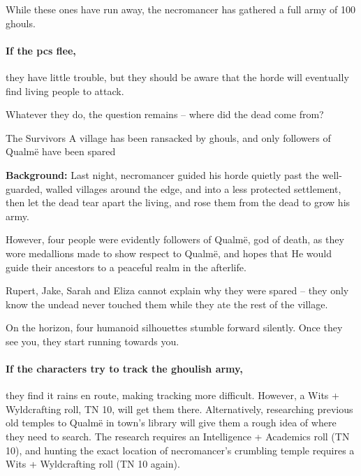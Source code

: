 While these ones have run away, the necromancer has gathered a full army of 100 ghouls.

\paragraph{If the \glspl{pc} flee,}
they have little trouble, but they should be aware that the horde will eventually find living people to attack.

Whatever they do, the question remains -- where did the dead come from?

{The Survivors}%
{A village has been ransacked by ghouls, and only followers of Qualm\"{e} have been spared}%

\textbf{Background:}
Last night, \gls{necromancer} guided his horde quietly past the well-guarded, walled \glspl{village} around the \gls{edge}, and into a less protected settlement, then let the dead tear apart the living, and rose them from the dead to grow his army.

However, four people were evidently followers of Qualm\"{e}, god of death, as they wore medallions made to show respect to Qualm\"{e}, and hopes that He would guide their ancestors to a peaceful realm in the afterlife.

Rupert, Jake, Sarah and Eliza cannot explain why they were spared -- they only know the undead never touched them while they ate the rest of the village.

\begin{boxtext}

  On the horizon, four humanoid silhouettes stumble forward silently.  Once they see you, they start running towards you.

\end{boxtext}

\paragraph{If the characters try to track the ghoulish army,}
they find it rains en route, making tracking more difficult.
However, a Wits + Wyldcrafting roll, TN 10, will get them there.
Alternatively, researching previous old temples to Qualm\"{e} in \gls{town}'s library will give them a rough idea of where they need to search.
The research requires an Intelligence + Academics roll (TN 10), and hunting the exact location of \gls{necromancer}'s crumbling temple requires a Wits + Wyldcrafting roll (TN 10 again).

